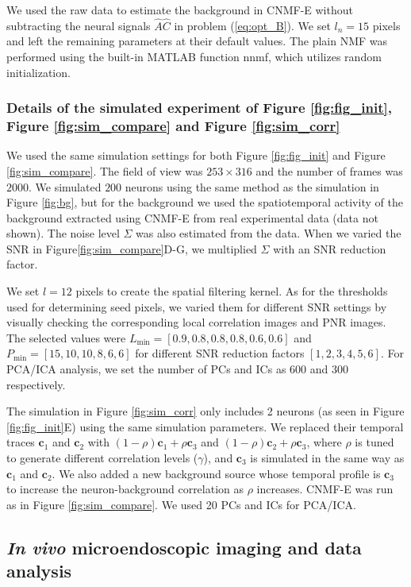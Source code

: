 \documentclass[9pt,lineno]{elife}
\begin{document}
We used the raw data to estimate the background in CNMF-E without subtracting the neural signals $\hat{A}\hat{C}$ in problem (\ref{eq:opt_B}).  We set $l_n=15$ pixels and left the remaining parameters at their default values. The plain NMF was performed using the built-in MATLAB function nnmf, which utilizes random initialization.  

\subsubsection{Details of the simulated experiment of Figure \ref{fig:fig_init}, Figure \ref{fig:sim_compare} and Figure \ref{fig:sim_corr}}
We used the same simulation settings for both Figure \ref{fig:fig_init} and Figure \ref{fig:sim_compare}. The field of view was $253\times 316$ and the number of frames was $2000$. We simulated $200$ neurons using the same method as the simulation in Figure \ref{fig:bg}, but for the background we used the spatiotemporal activity of the background extracted using CNMF-E from real experimental data (data not shown). The noise level $\Sigma$ was also estimated from the data. When we varied the SNR in Figure\ref{fig:sim_compare}D-G, we multiplied $\Sigma$ with an SNR reduction factor. 

We set $l=12$ pixels to create the spatial filtering kernel. As for the thresholds used for determining seed pixels, we varied them for different SNR settings by visually checking the corresponding local correlation images and PNR images. The selected values were $L_{\min}=[0.9, 0.8, 0.8, 0.8, 0.6, 0.6]$ and $P_{\min}=[15, 10, 10, 8, 6, 6]$ for different SNR reduction factors $[1,2,3,4,5,6]$. For PCA/ICA analysis, we set the number of PCs and ICs as $600$ and $300$ respectively.

The simulation in Figure \ref{fig:sim_corr} only includes 2 neurons (as seen in Figure \ref{fig:fig_init}E) using the same simulation parameters. We replaced their temporal traces $\bm{c}_1$ and $\bm{c}_2$ with $(1-\rho)\bm{c}_1 + \rho \bm{c}_3$ and $(1-\rho)\bm{c}_2+\rho\bm{c}_3$, where $\rho$ is tuned to generate different correlation levels ($\gamma$), and $\bm{c}_3$ is simulated in the same way as $\bm{c}_1$  and $\bm{c}_2$. We also added a new background source whose temporal profile is $\bm{c}_3$ to increase the neuron-background correlation as $\rho$ increases. CNMF-E was run as in Figure \ref{fig:sim_compare}. We used 20 PCs and ICs for PCA/ICA.

\subsection{\emph{In vivo} microendoscopic imaging and data analysis}
\end{document}
